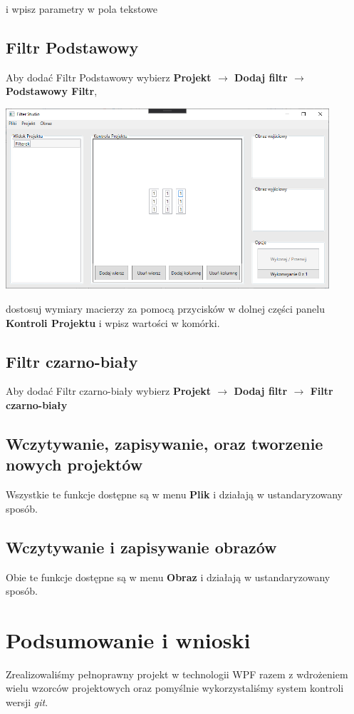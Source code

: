 \documentclass{article}
\begin{document}
i wpisz parametry w pola tekstowe

\subsection{Filtr Podstawowy}
Aby dodać Filtr Podstawowy wybierz \textbf{Projekt $\rightarrow$ Dodaj filtr $\rightarrow$ Podstawowy Filtr},

\bigskip
\includegraphics[width=0.9\textwidth]{matrix.png}
\bigskip

dostosuj wymiary macierzy za pomocą przycisków w dolnej części panelu \textbf{Kontroli Projektu} i wpisz wartości w komórki.

\subsection{Filtr czarno-biały}
Aby dodać Filtr czarno-biały wybierz \textbf{Projekt $\rightarrow$ Dodaj filtr $\rightarrow$ Filtr czarno-biały}

\subsection{Wczytywanie, zapisywanie, oraz tworzenie nowych projektów}
Wszystkie te funkcje dostępne są w menu \textbf{Plik} i działają w ustandaryzowany sposób.

\subsection{Wczytywanie i zapisywanie obrazów}
Obie te funkcje dostępne są w menu \textbf{Obraz} i działają w ustandaryzowany sposób.


\section{Podsumowanie i wnioski}
Zrealizowaliśmy pełnoprawny projekt w technologii WPF razem z wdrożeniem wielu wzorców projektowych oraz pomyślnie
wykorzystaliśmy system kontroli wersji \textit{git}.
\end{document}
